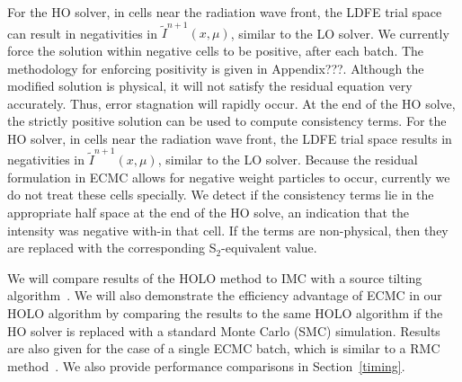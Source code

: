 \documentclass{mc2013}
\begin{document}
For the HO solver, in cells near the radiation wave front, the LDFE trial space can result in negativities in
$\tilde{I}^{n+1}(x,\mu)$, similar to the LO solver.  We currently force the solution within negative cells to be
positive, after each batch. The methodology for enforcing positivity is given in Appendix???.
  Although the modified solution is
physical, it will not satisfy the residual equation very accurately.  Thus, error stagnation will
rapidly occur. At the end of the HO solve, the strictly positive solution can be used
to compute consistency terms.
For the HO solver, in cells near the radiation wave front, the LDFE trial space results in negativities in
$\tilde{I}^{n+1}(x,\mu)$, similar to the LO solver.  Because the residual formulation in ECMC allows for negative weight
particles to occur, currently we do not treat these cells specially.  We detect if
the consistency terms lie in the appropriate half space at the end of the HO solve,
an indication that the intensity was negative with-in that cell.  If the terms are non-physical, then
they are replaced with the corresponding S$_2$-equivalent value.  


We will compare results of the HOLO method to IMC with
a source tilting algorithm~\cite{jayenne}.  We will also demonstrate the efficiency advantage of ECMC in our HOLO
algorithm by comparing the results to the same HOLO algorithm if the HO solver
is replaced with a standard Monte Carlo (SMC) simulation.  Results are also given for
the case of a single ECMC batch, which is similar to a RMC method~\cite{rmc}.  We
also provide performance comparisons in Section~\ref{timing}.
\end{document}
